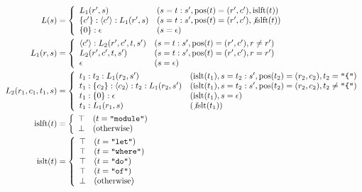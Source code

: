\begin{align*}
  L(s) &= \left\{\begin{array}{ll}
    L_1(r', s) &(s = t:s', \mathrm{pos}(t) = (r', c'), \mathrm{islft}(t)) \\
    \{c'\}:\langle c'\rangle:L_1(r', s) &(s = t:s', \mathrm{pos}(t) = (r', c'), \not\mathrm{islft}(t)) \\
    \{0\}:\epsilon &(s = \epsilon)
  \end{array}\right. \\
  L_1(r, s) &= \left\{\begin{array}{ll}
    \langle c'\rangle:L_2(r', c', t, s') &(s = t:s', \mathrm{pos}(t) = (r', c'), r \neq r') \\
    L_2(r', c', t, s') &(s = t:s', \mathrm{pos}(t) = (r', c'), r = r') \\
    \epsilon &(s = \epsilon)
  \end{array}\right. \\
  L_2(r_1, c_1, t_1, s) &= \left\{\begin{array}{ll}
    t_1:t_2:L_1(r_2, s') &(\mathrm{islt}(t_1), s = t_2:s', \mathrm{pos}(t_2) = (r_2, c_2), t_2 = \text{\texttt{\textquotedbl\{\textquotedbl}}) \\
    t_1:\{c_2\}:\langle c_2\rangle:t_2:L_1(r_2, s') &(\mathrm{islt}(t_1), s = t_2:s', \mathrm{pos}(t_2) = (r_2, c_2), t_2 \neq \text{\texttt{\textquotedbl\{\textquotedbl}}) \\
    t_1:\{0\}:\epsilon &(\mathrm{islt}(t_1), s = \epsilon) \\
    t_1:L_1(r_1, s) &(\not\mathrm{islt}(t_1))
  \end{array}\right. \\
  \mathrm{islft}(t) &= \left\{\begin{array}{ll}
    \top &(t = \text{\texttt{\textquotedbl module\textquotedbl}}) \\
    \bot &(\text{otherwise})
  \end{array}\right. \\
  \mathrm{islt}(t) &= \left\{\begin{array}{ll}
    \top &(t = \text{\texttt{\textquotedbl let\textquotedbl}}) \\
    \top &(t = \text{\texttt{\textquotedbl where\textquotedbl}}) \\
    \top &(t = \text{\texttt{\textquotedbl do\textquotedbl}}) \\
    \top &(t = \text{\texttt{\textquotedbl of\textquotedbl}}) \\
    \bot &(\text{otherwise})
  \end{array}\right.
\end{align*}

